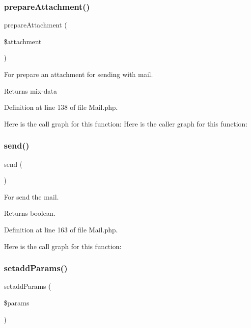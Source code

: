 \subsubsection{\texorpdfstring{prepare\+Attachment()}{prepareAttachment()}}
{\footnotesize\ttfamily prepare\+Attachment (\begin{DoxyParamCaption}\item[{}]{\$attachment }\end{DoxyParamCaption})}

For prepare an attachment for sending with mail.

\begin{DoxyReturn}{Returns}
mix-\/data 
\end{DoxyReturn}


Definition at line 138 of file Mail.\+php.

Here is the call graph for this function\+:
Here is the caller graph for this function\+:
\mbox{\label{class_zest_1_1_mail_1_1_mail_a12bcef5130168b80d3d52dc82213f19a}} 
\subsubsection{\texorpdfstring{send()}{send()}}
{\footnotesize\ttfamily send (\begin{DoxyParamCaption}{ }\end{DoxyParamCaption})}

For send the mail.

\begin{DoxyReturn}{Returns}
boolean. 
\end{DoxyReturn}


Definition at line 163 of file Mail.\+php.

Here is the call graph for this function\+:
\mbox{\label{class_zest_1_1_mail_1_1_mail_afeb2c23899fa9c5524de47099eccfa12}} 
\subsubsection{\texorpdfstring{setadd\+Params()}{setaddParams()}}
{\footnotesize\ttfamily setadd\+Params (\begin{DoxyParamCaption}\item[{}]{\$params }\end{DoxyParamCaption})}

